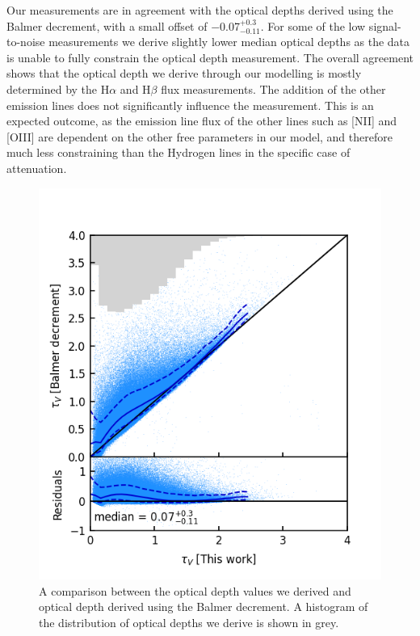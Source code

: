 \documentclass[fleqn,usenatbib]{mnras}
\begin{document}
Our measurements are in agreement with the optical depths derived using the Balmer decrement, with a small offset of $-$0.07$_{-0.11}^{+0.3}$. For some of the low signal-to-noise measurements we derive slightly lower median optical depths as the data is unable to fully constrain the optical depth measurement. The overall agreement shows that the optical depth we derive through our modelling is mostly determined by the H$\alpha$ and H$\beta$ flux measurements. The addition of the other emission lines does not significantly influence the measurement. This is an expected outcome, as the emission line flux of the other lines such as [NII] and [OIII] are dependent on the other free parameters in our model, and therefore much less constraining than the Hydrogen lines in the specific case of attenuation. 

\begin{figure}
    \centering
    \includegraphics[width=\columnwidth]{figures/fig5.png}
    \caption{A comparison between the optical depth values we derived and optical depth derived using the Balmer decrement. A histogram of the distribution of optical depths we derive is shown in grey.}
    \label{fig:model_dust_attenuation_vs_Balmer_decrement}
\end{figure}
\end{document}
